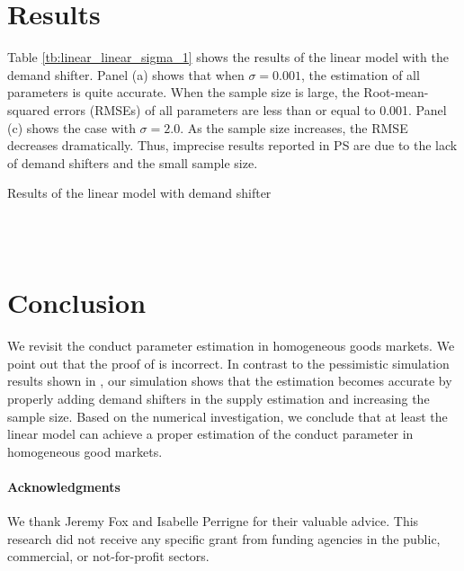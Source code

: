 \documentclass[11pt, a4paper]{article}
\begin{document}


\section{Results}\label{sec:results}

Table \ref{tb:linear_linear_sigma_1} shows the results of the linear model with the demand shifter.
Panel (a) shows that when $\sigma = 0.001$, the estimation of all parameters is quite accurate.
When the sample size is large, the Root-mean-squared errors (RMSEs) of all parameters are less than or equal to 0.001. 
Panel (c) shows the case with $\sigma = 2.0$. As the sample size increases, the RMSE decreases dramatically. 
Thus, imprecise results reported in PS are due to the lack of demand shifters and the small sample size.



\begin{table}[!htbp]
  \begin{center}
      \caption{Results of the linear model with demand shifter}
      \label{tb:linear_linear_sigma_1} 
      \subfloat[$\sigma=0.001$]{}\\
      \subfloat[$\sigma=0.5$]{}\\
    \subfloat[$\sigma=2.0$]{}
  \end{center}
\end{table} 



\section{Conclusion}
We revisit the conduct parameter estimation in homogeneous goods markets. 
We point out that the proof of \cite{perloff2012collinearity} is incorrect. In contrast to the pessimistic simulation results shown in \cite{perloff2012collinearity}, our simulation shows that the estimation becomes accurate by properly adding demand shifters in the supply estimation and increasing the sample size. Based on the numerical investigation, we conclude that at least the linear model can achieve a proper estimation of the conduct parameter in homogeneous good markets.


\paragraph{Acknowledgments}
We thank Jeremy Fox and Isabelle Perrigne for their valuable advice. This research did not receive any specific grant from funding agencies in the public, commercial, or not-for-profit sectors. 
\end{document}
